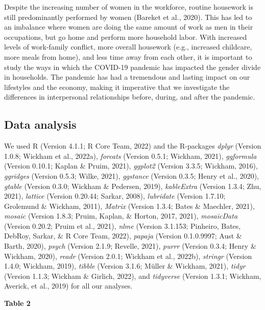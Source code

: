 \documentclass[
  english,
  man]{apa6}
\begin{document}
Despite the increasing number of women in the workforce, routine housework is still predominantly performed by women (Bareket et al., 2020). This has led to an imbalance where women are doing the same amount of work as men in their occupations, but go home and perform more household labor. With increased levels of work-family conflict, more overall housework (e.g., increased childcare, more meals from home), and less time away from each other, it is important to study the ways in which the COVID-19 pandemic has impacted the gender divide in households. The pandemic has had a tremendous and lasting impact on our lifestyles and the economy, making it imperative that we investigate the differences in interpersonal relationships before, during, and after the pandemic.

\newpage

\hypertarget{data-analysis}{%
\subsection{Data analysis}\label{data-analysis}}

We used R (Version 4.1.1; R Core Team, 2022) and the R-packages \emph{dplyr} (Version 1.0.8; Wickham et al., 2022a), \emph{forcats} (Version 0.5.1; Wickham, 2021), \emph{ggformula} (Version 0.10.1; Kaplan \& Pruim, 2021), \emph{ggplot2} (Version 3.3.5; Wickham, 2016), \emph{ggridges} (Version 0.5.3; Wilke, 2021), \emph{ggstance} (Version 0.3.5; Henry et al., 2020), \emph{gtable} (Version 0.3.0; Wickham \& Pedersen, 2019), \emph{kableExtra} (Version 1.3.4; Zhu, 2021), \emph{lattice} (Version 0.20.44; Sarkar, 2008), \emph{lubridate} (Version 1.7.10; Grolemund \& Wickham, 2011), \emph{Matrix} (Version 1.3.4; Bates \& Maechler, 2021), \emph{mosaic} (Version 1.8.3; Pruim, Kaplan, \& Horton, 2017, 2021), \emph{mosaicData} (Version 0.20.2; Pruim et al., 2021), \emph{nlme} (Version 3.1.153; Pinheiro, Bates, DebRoy, Sarkar, \& R Core Team, 2022), \emph{papaja} (Version 0.1.0.9997; Aust \& Barth, 2020), \emph{psych} (Version 2.1.9; Revelle, 2021), \emph{purrr} (Version 0.3.4; Henry \& Wickham, 2020), \emph{readr} (Version 2.0.1; Wickham et al., 2022b), \emph{stringr} (Version 1.4.0; Wickham, 2019), \emph{tibble} (Version 3.1.6; Müller \& Wickham, 2021), \emph{tidyr} (Version 1.1.3; Wickham \& Girlich, 2022), and \emph{tidyverse} (Version 1.3.1; Wickham, Averick, et al., 2019) for all our analyses.

\newpage

\textbf{Table 2}
\end{document}
